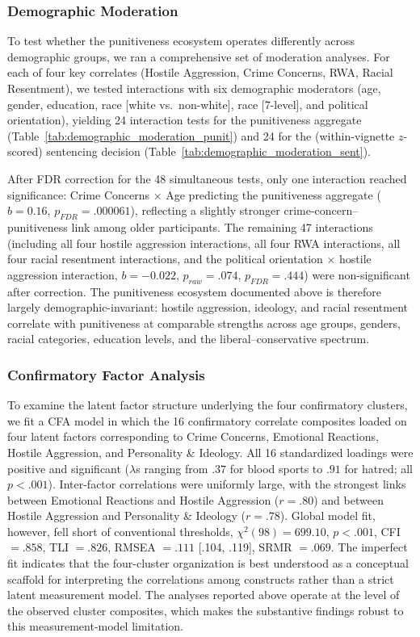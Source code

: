 \subsubsection{Demographic Moderation}

To test whether the punitiveness ecosystem operates differently across demographic groups, we ran a comprehensive set of moderation analyses. For each of four key correlates (Hostile Aggression, Crime Concerns, RWA, Racial Resentment), we tested interactions with six demographic moderators (age, gender, education, race [white vs.\ non-white], race [7-level], and political orientation), yielding 24 interaction tests for the punitiveness aggregate (Table~\ref{tab:demographic_moderation_punit}) and 24 for the (within-vignette $z$-scored) sentencing decision (Table~\ref{tab:demographic_moderation_sent}).

After FDR correction for the 48 simultaneous tests, only one interaction reached significance: Crime Concerns $\times$ Age predicting the punitiveness aggregate ($b = 0.16$, $p_\textit{FDR} = .000061$), reflecting a slightly stronger crime-concern--punitiveness link among older participants. The remaining 47 interactions (including all four hostile aggression interactions, all four RWA interactions, all four racial resentment interactions, and the political orientation $\times$ hostile aggression interaction, $b = -0.022$, $p_\textit{raw} = .074$, $p_\textit{FDR} = .444$) were non-significant after correction. The punitiveness ecosystem documented above is therefore largely demographic-invariant: hostile aggression, ideology, and racial resentment correlate with punitiveness at comparable strengths across age groups, genders, racial categories, education levels, and the liberal--conservative spectrum.

\subsubsection{Confirmatory Factor Analysis}

To examine the latent factor structure underlying the four confirmatory clusters, we fit a CFA model in which the 16 confirmatory correlate composites loaded on four latent factors corresponding to Crime Concerns, Emotional Reactions, Hostile Aggression, and Personality \& Ideology. All 16 standardized loadings were positive and significant ($\lambda$s ranging from $.37$ for blood sports to $.91$ for hatred; all $p < .001$). Inter-factor correlations were uniformly large, with the strongest links between Emotional Reactions and Hostile Aggression ($r = .80$) and between Hostile Aggression and Personality \& Ideology ($r = .78$). Global model fit, however, fell short of conventional thresholds, $\chi^2(98) = 699.10$, $p < .001$, CFI $= .858$, TLI $= .826$, RMSEA $= .111$ [.104, .119], SRMR $= .069$. The imperfect fit indicates that the four-cluster organization is best understood as a conceptual scaffold for interpreting the correlations among constructs rather than a strict latent measurement model. The analyses reported above operate at the level of the observed cluster composites, which makes the substantive findings robust to this measurement-model limitation.

